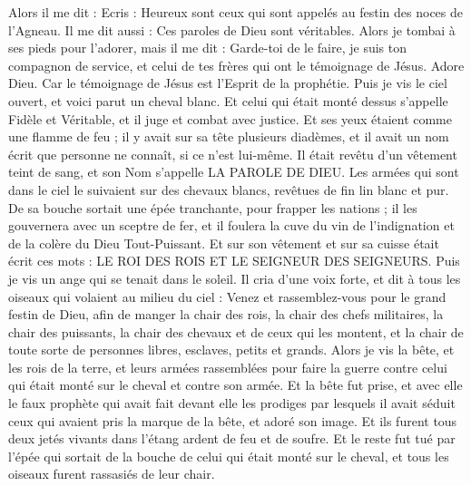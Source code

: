 \begin{multicols}{2}
Alors il me dit : Ecris : Heureux sont ceux qui sont appelés au festin des noces de l'Agneau. Il me dit aussi : Ces paroles de Dieu sont véritables.
Alors je tombai à ses pieds pour l'adorer, mais il me dit : Garde-toi de le faire, je suis ton compagnon de service, et celui de tes frères qui ont le témoignage de Jésus. Adore Dieu. Car le témoignage de Jésus est l'Esprit de la prophétie.
Puis je vis le ciel ouvert, et voici parut un cheval blanc. Et celui qui était monté dessus s'appelle Fidèle et Véritable, et il juge et combat avec justice.
Et ses yeux étaient comme une flamme de feu ; il y avait sur sa tête plusieurs diadèmes, et il avait un nom écrit que personne ne connaît, si ce n'est lui-même.
Il était revêtu d'un vêtement teint de sang, et son Nom s'appelle LA PAROLE DE DIEU.
Les armées qui sont dans le ciel le suivaient sur des chevaux blancs, revêtues de fin lin blanc et pur.
De sa bouche sortait une épée tranchante, pour frapper les nations ; il les gouvernera avec un sceptre de fer, et il foulera la cuve du vin de l'indignation et de la colère du Dieu Tout-Puissant.
Et sur son vêtement et sur sa cuisse était écrit ces mots : LE ROI DES ROIS ET LE SEIGNEUR DES SEIGNEURS.
Puis je vis un ange qui se tenait dans le soleil. Il cria d'une voix forte, et dit à tous les oiseaux qui volaient au milieu du ciel : Venez et rassemblez-vous pour le grand festin de Dieu,
afin de manger la chair des rois, la chair des chefs militaires, la chair des puissants, la chair des chevaux et de ceux qui les montent, et la chair de toute sorte de personnes libres, esclaves, petits et grands.
Alors je vis la bête, et les rois de la terre, et leurs armées rassemblées pour faire la guerre contre celui qui était monté sur le cheval et contre son armée.
Et la bête fut prise, et avec elle le faux prophète qui avait fait devant elle les prodiges par lesquels il avait séduit ceux qui avaient pris la marque de la bête, et adoré son image. Et ils furent tous deux jetés vivants dans l'étang ardent de feu et de soufre.
Et le reste fut tué par l'épée qui sortait de la bouche de celui qui était monté sur le cheval, et tous les oiseaux furent rassasiés de leur chair.

\end{multicols}
